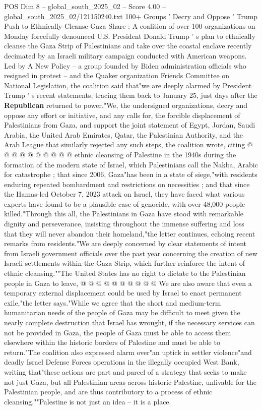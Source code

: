 \begin{textsample}{POS Dim 8 – global\_south\_2025\_02 – Score 4.00 – global\_south\_2025\_02/121150240.txt}  \label{ex:f8_pos_390}
100+ Groups ' Decry and Oppose ' Trump Push to Ethnically Cleanse Gaza Share : A coalition of over 100 organizations on Monday forcefully denounced U.S.
President Donald Trump ' s plan to ethnically cleanse the Gaza Strip of Palestinians and take over the coastal enclave recently decimated by an Israeli military campaign conducted with American weapons.
Led by A New Policy -- a group founded by Biden administration officials who resigned in protest -- and the Quaker organization Friends Committee on National Legislation, the coalition said that"we are deeply alarmed by President Trump ' s recent statements, tracing them back to January 25, just days after the \textbf{Republican} returned to power."We, the undersigned organizations, decry and oppose any effort or initiative, and any calls for, the forcible displacement of Palestinians from Gaza, and support the joint statement of Egypt, Jordan, Saudi Arabia, the United Arab Emirates, Qatar, the Palestinian Authority, and the Arab League that similarly rejected any such steps, the coalition wrote, citing @ @ @ @ @ @ @ @ @ @ ethnic cleansing of Palestine in the 1940s during the formation of the modern state of Israel, which Palestinians call the Nakba, Arabic for catastrophe ; that since 2006, Gaza"has been in a state of siege,"with residents enduring repeated bombardment and restrictions on necessities ; and that since the Hamas-led October 7, 2023 attack on Israel, they have faced what various experts have found to be a plausible case of genocide, with over 48,000 people killed."Through this all, the Palestinians in Gaza have stood with remarkable dignity and perseverance, insisting throughout the immense suffering and loss that they will never abandon their homeland,"the letter continues, echoing recent remarks from residents."We are deeply concerned by clear statements of intent from Israeli government officials over the past year concerning the creation of new Israeli settlements within the Gaza Strip, which further reinforce the intent of ethnic cleansing.""The United States has no right to dictate to the Palestinian people in Gaza to leave, @ @ @ @ @ @ @ @ @ @ We are also aware that even a temporary external displacement could be used by Israel to enact permanent exile,"the letter says."While we agree that the short and medium-term humanitarian needs of the people of Gaza may be difficult to meet given the nearly complete destruction that Israel has wrought, if the necessary services can not be provided in Gaza, the people of Gaza must be able to access them elsewhere within the historic borders of Palestine and must be able to return."The coalition also expressed alarm over"an uptick in settler violence"and deadly Israel Defense Forces operations in the illegally occupied West Bank, writing that"these actions are part and parcel of a strategy that seeks to make not just Gaza, but all Palestinian areas across historic Palestine, unlivable for the Palestinian people, and are thus contributory to a process of ethnic cleansing.""Palestine is not just an idea -- it is a place.

\end{textsample}
